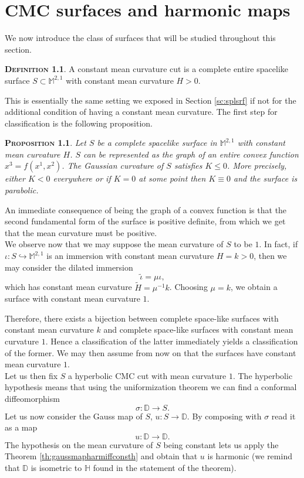\documentclass[a4paper,11pt,openright,twoside]{book}
\newcommand{\M}{\mathbb{M}^{2,1}}
\newcommand{\1}{\mathds{1}}
\theoremstyle{plain}
\newtheorem{prop}[thm]{\textsc{Proposition}}
\theoremstyle{definition}
\newtheorem{defn}[thm]{\textsc{Definition}}
\theoremstyle{remark}
\begin{document}
\chapter{CMC surfaces and harmonic maps}\label{sc:cmcsurfharmmp}

We now introduce the class of surfaces that will be studied throughout this section.
\begin{defn}
	A constant mean curvature cut is a complete entire spacelike surface
	$S \subset \M$ with constant mean curvature $H>0$.
\end{defn}
This is essentially the same setting we exposed in Section \ref{sc:splsrf} if not for the additional condition of having a constant mean curvature.
The first step for classification is the following proposition.
\begin{prop}\label{pr:convfun}
	Let $S$ be a complete spacelike surface in $\M$ with constant mean curvature $H$.
	$S$ can be represented as the graph of an entire convex function
	$x^3=f(x^1,x^2)$.
	The Gaussian curvature of $S$ satisfies
	$K \leq 0$. More precisely, either $K<0$ everywhere or if  $K=0$ at some point then $K\equiv 0$ and the surface is parabolic.
\end{prop}

An immediate consequence of being the graph of a convex function is that the second fundamental form of the surface is positive definite, from which we get that the mean curvature must be positive.\\

We observe now that we may suppose the mean curvature of $S$ to be $1$. In fact, if $\iota:S\hookrightarrow \M$ is an immersion with constant mean curvature $H=k>0$, then we may consider the dilated immersion
\[
\tilde \iota = \mu\iota ,
\]
which has constant mean curvature $\tilde H = \mu^{-1}k$.
Choosing $\mu= k$, we obtain a surface with constant mean curvature $1$.

Therefore, there exists a bijection between complete space-like surfaces with constant mean curvature $k$ and complete space-like surfaces with constant mean curvature $1$. Hence a classification of the latter immediately yields a classification of the former. We may then assume from now on that the surfaces have constant mean curvature $1$.\\


Let us then fix $S$ a hyperbolic CMC cut with mean curvature $1$. The hyperbolic hypothesis means that using the uniformization theorem we can find a conformal diffeomorphism
\[
	\sigma:\mathbb D \to S.
\]
Let us now consider the Gauss map of  $S$, $u:S\to \mathbb{D}$. By composing with $\sigma$ read it as a map
\[
	u:\mathbb D \to \mathbb{D}.
\]
The hypothesis on the mean curvature of $S$ being constant lets us apply the Theorem  \ref{th:gaussmapharmiffconsth} and obtain that $u$ is harmonic (we remind that $\mathbb{D}$ is isometric to $\mathbb{H}$ found in the statement of the theorem).\\
\end{document}
